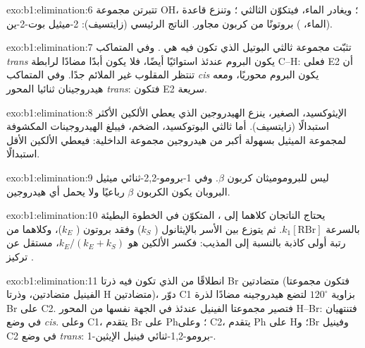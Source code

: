 \begin{solution}{exo:b1:elimination:6}
تتبرتن مجموعة OH، ؛ ويغادر الماء، فيتكوّن 
الثالثي ؛ وتنزع قاعدة (الماء، )
بروتونًا من كربون مجاور. الناتج الرئيسي (زايتسيف):
2-ميثيل بوت-2-ين.
\end{solution}

\begin{solution}{exo:b1:elimination:7}
تثبّت مجموعة ثالثي البوتيل  الذي تكون فيه هي . وفي
المتماكب \textit{trans} يكون البروم عندئذ استوائيًا أيضًا، فلا يكون أبدًا مضادًا لرابطة
C--H: فعلى E2 أن تنتظر  المقلوب غير الملائم جدًا. وفي
المتماكب \textit{cis} يكون البروم محوريًا، ومعه هيدروجينان ثنائيا المحور
\textit{trans}: فتكون E2 سريعة.
\end{solution}

\begin{solution}{exo:b1:elimination:8}
الإيثوكسيد، الصغير، ينزع الهيدروجين الذي يعطي الألكين الأكثر
استبدالًا (زايتسيف). أما ثالثي البوتوكسيد، الضخم، فيبلغ الهيدروجينات المكشوفة
لمجموعة الميثيل بسهولة أكبر من هيدروجين مجموعة 
الداخلية: فيعطي الألكين الأقل استبدالًا.
\end{solution}

\begin{solution}{exo:b1:elimination:9}
ليس للبروموميثان كربون $\beta$. وفي 1-برومو-2,2-ثنائي ميثيل البروبان يكون
الكربون $\beta$ رباعيًا ولا يحمل أي هيدروجين.
\end{solution}

\begin{solution}{exo:b1:elimination:10}
يحتاج الناتجان كلاهما إلى ، المتكوّن في الخطوة البطيئة بالسرعة
$k_1[\mathrm{RBr}]$. ثم يتوزع بين الأسر بالإيثانول ( $k_S$) وفقد بروتون ( $k_E$)، وكلاهما
من رتبة أولى كاذبة بالنسبة إلى المذيب: فكسر الألكين هو
$k_E/(k_E + k_S)$، مستقل عن تركيز .
\end{solution}

\begin{solution}{exo:b1:elimination:11}
انطلاقًا من   الذي تكون فيه ذرتا Br متضادتين
(فتكون مجموعتا الفينيل متضادتين، وذرتا H متضادتين)، دوّر C1 بزاوية $120^\circ$ لتضع
هيدروجينه مضادًا لذرة Br على C2. فتصير مجموعتا الفينيل عندئذ في
الجهة نفسها من المحور H--Br: فتنتهيان في وضع \textit{cis}. وعلى C1، يتقدم Br على
Ph؛ وعلى C2، يتقدم Ph على H؛ وBr وفينيل C2 في وضع \textit{trans}:
1-برومو-1,2-ثنائي فينيل الإيثين-.
\end{solution}

